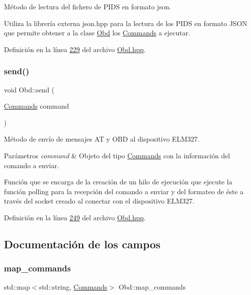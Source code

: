 Método de lectura del fichero de P\+I\+DS en formato json. 

Utiliza la librería externa json.\+hpp para la lectura de los P\+I\+DS en formato J\+S\+ON que permite obtener a la clase \hyperlink{classObd}{Obd} los \hyperlink{classCommands}{Commands} a ejecutar. 

Definición en la línea \hyperlink{Obd_8hpp_source_l00229}{229} del archivo \hyperlink{Obd_8hpp_source}{Obd.\+hpp}.

\mbox{\label{classObd_a453591bc9a280e8d44d82025ce8590e9}} 
\subsubsection{\texorpdfstring{send()}{send()}}
{\footnotesize\ttfamily void Obd\+::send (\begin{DoxyParamCaption}\item[{\hyperlink{classCommands}{Commands}}]{command }\end{DoxyParamCaption})\hspace{0.3cm}{\ttfamily [inline]}}



Método de envío de mensajes AT y O\+BD al dispositivo E\+L\+M327. 


\begin{DoxyParams}{Parámetros}
{\em command} & Objeto del tipo \hyperlink{classCommands}{Commands} con la información del comando a enviar.\\
\hline
\end{DoxyParams}
Función que se encarga de la creación de un hilo de ejecución que ejecute la función polling para la recepción del comando a enviar y del formateo de éste a través del socket creado al conectar con el dispositivo E\+L\+M327. 

Definición en la línea \hyperlink{Obd_8hpp_source_l00249}{249} del archivo \hyperlink{Obd_8hpp_source}{Obd.\+hpp}.



\subsection{Documentación de los campos}
\mbox{\label{classObd_a8300062d1b651d049cf2a2bc916496cd}} 
\subsubsection{\texorpdfstring{map\+\_\+commands}{map\_commands}}
{\footnotesize\ttfamily std\+::map$<$std\+::string, \hyperlink{classCommands}{Commands}$>$ Obd\+::map\+\_\+commands}

